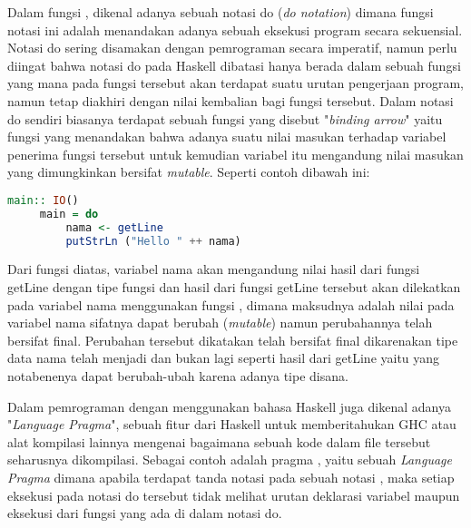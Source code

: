 \documentclass[pi.tex]{subfile}
\begin{document}
  \hspace{10pt}Dalam fungsi , dikenal adanya sebuah notasi do (\emph{do notation}) dimana fungsi notasi ini adalah menandakan adanya sebuah eksekusi program secara sekuensial. Notasi do sering disamakan dengan pemrograman secara imperatif, namun perlu diingat bahwa notasi do pada Haskell dibatasi hanya berada dalam sebuah fungsi yang mana pada fungsi tersebut akan terdapat suatu urutan pengerjaan program, namun tetap diakhiri dengan nilai kembalian bagi fungsi tersebut. Dalam notasi do sendiri biasanya terdapat sebuah fungsi \fhaskell{($<$-)} yang disebut "\emph{binding arrow}" yaitu fungsi yang menandakan bahwa adanya suatu nilai masukan terhadap variabel penerima fungsi tersebut untuk kemudian variabel itu mengandung nilai masukan yang dimungkinkan bersifat \emph{mutable}. Seperti contoh dibawah ini:\\
   \begin{lstlisting}[language=Haskell]
     main:: IO()
     main = do
         nama <- getLine
         putStrLn ("Hello " ++ nama)
   \end{lstlisting}

   \hspace{10pt}Dari fungsi diatas, variabel nama akan mengandung nilai hasil dari fungsi getLine dengan tipe fungsi  dan hasil dari fungsi getLine tersebut akan dilekatkan pada variabel nama menggunakan fungsi \fhaskell{($<$-)}, dimana maksudnya adalah nilai pada variabel nama sifatnya dapat berubah (\emph{mutable}) namun perubahannya telah bersifat final. Perubahan tersebut dikatakan telah bersifat final dikarenakan tipe data nama telah menjadi  dan bukan lagi seperti hasil dari getLine yaitu  yang notabenenya dapat berubah-ubah karena adanya tipe  disana.

   \hspace{10pt}Dalam pemrograman dengan menggunakan bahasa Haskell juga dikenal adanya "\emph{Language Pragma}", sebuah fitur dari Haskell untuk memberitahukan GHC atau alat kompilasi lainnya mengenai bagaimana sebuah kode dalam file tersebut seharusnya dikompilasi. Sebagai contoh adalah pragma , yaitu sebuah \emph{Language Pragma} dimana apabila terdapat tanda notasi  pada sebuah notasi , maka setiap eksekusi pada notasi do tersebut tidak melihat urutan deklarasi variabel maupun eksekusi dari fungsi yang ada di dalam notasi do.
\end{document}
